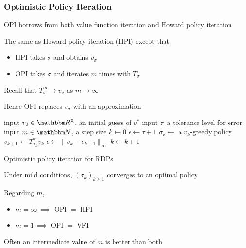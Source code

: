 \begin{frame}
    \frametitle{Optimistic Policy Iteration}

    OPI borrows from both value function iteration and Howard policy iteration

    \vspace{0.5em}
    The same as Howard policy iteration (HPI) except that
    \begin{itemize}
        \item HPI takes $\sigma$ and obtains $v_\sigma$
    \vspace{0.5em}
        \item OPI takes $\sigma$ and iterates $m$ times with $T_{\sigma}$
    \end{itemize}


    \vspace{0.5em}
    Recall that $T^m_{\sigma} \to v_\sigma$ as $m \to \infty$

    \vspace{0.5em}
    \vspace{0.5em}
    Hence OPI replaces $v_\sigma$ with an approximation

\end{frame}


\begin{frame}
    
    {\small
    \begin{algorithm}[H]
        \DontPrintSemicolon
        input $v_0 \in \RR^\Xsf$, an initial guess of $v^*$ \;
        input $\tau$, a tolerance level for error \;
        input $m \in \NN$, a step size \;
        $k \leftarrow 0$ \;
        $\epsilon \leftarrow \tau + 1$ \;
        \While{$\epsilon > \tau $}
        {
            $\sigma_k \leftarrow $ a $v_k$-greedy policy \;
            $v_{k+1} \leftarrow T_{\sigma_k}^m v_k$  \;
            $\epsilon \leftarrow \| v_k - v_{k+1} \|_\infty$ \;
            $k \leftarrow k + 1$ \;
        }
        \caption{Optimistic policy iteration for RDPs}
    \end{algorithm}
    }

\end{frame}


\begin{frame}
    

    Under mild conditions, $(\sigma_k)_{k \geq 1}$ converges to an optimal policy
    \vspace{0.5em}
    \vspace{0.5em}

    Regarding $m$,
    \begin{itemize}
        \item $m=\infty \, \implies$ OPI $=$ HPI
    \vspace{0.5em}
        \item $m=1 \, \implies$ OPI $=$ VFI
    \end{itemize}

    \vspace{0.5em}
    \vspace{0.5em}
    \vspace{0.5em}
    Often an intermediate value of $m$ is better than both


\end{frame}

